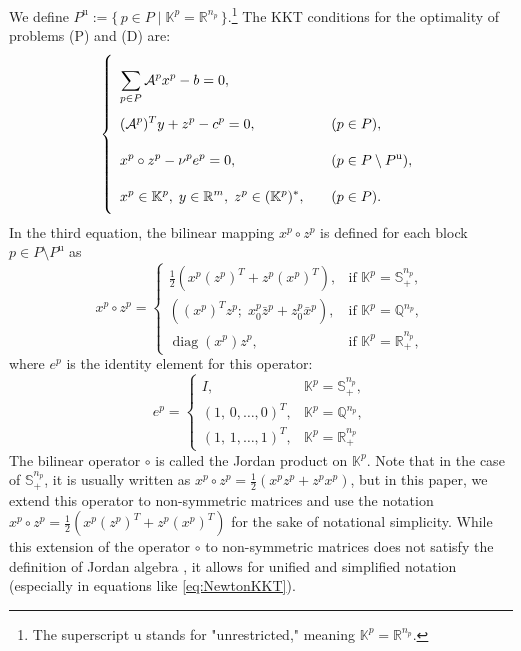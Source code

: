We define $P^{\text{u}} := \{\, p \in P \mid \mathbb{K}^p = \mathbb{R}^{n_p} \,\}$.\footnote{%
  The superscript $\text{u}$ stands for "unrestricted," meaning $\mathbb{K}^p = \mathbb{R}^{n_p}$.
}
The KKT conditions for the optimality of problems (P) and (D) are:
\begin{equation}
    \everymath{\displaystyle}
    \renewcommand{\arraystretch}{2.5}
    \left\{
    \begin{array}{ll}
        \sum_{p \in P} \mathcal{A}^p x^p - b = 0, & \\[-4pt]
        (\mathcal{A}^p)^T y + z^p - c^p = 0, & \quad (p \in P),\\[-4pt]
        x^p \circ z^p - \nu^p e^p = 0, & \quad (p \in P \setminus P^{\text{u}}),\\[-4pt]
        x^p \in \mathbb{K}^p,\; y \in \mathbb{R}^m,\; z^p \in (\mathbb{K}^p)^*, & \quad (p \in P).
    \end{array}
    \right.
    \label{eq:KKTcond}
\end{equation}
In the third equation, the bilinear mapping $x^p \circ z^p$ is defined for each block $p \in P \setminus P^{\text{u}}$ as
\[
  x^p \circ z^p = 
  \begin{cases}
    \frac{1}{2} \left( x^p (z^p)^T + z^p (x^p)^T \right), 
      & \text{if } \mathbb{K}^p = \mathbb{S}^{n_p}_+,\\[4pt]
    \left( (x^p)^T z^p;\; x^p_0 \bar{z}^p + z^p_0 \bar{x}^p \right),
      & \text{if } \mathbb{K}^p = \mathbb{Q}^{n_p},\\[4pt]
    \operatorname{diag}(x^p) z^p,
      & \text{if } \mathbb{K}^p = \mathbb{R}^{n_p}_+,
  \end{cases}
\]
where $e^p$ is the identity element for this operator:
\[
  e^p = 
  \begin{cases}
    I, & \mathbb{K}^p = \mathbb{S}^{n_p}_+,\\[3pt]
    (1,\,0,\ldots,0)^T, & \mathbb{K}^p = \mathbb{Q}^{n_p},\\[3pt]
    (1,\,1,\ldots,1)^T, & \mathbb{K}^p = \mathbb{R}^{n_p}_+ %
  \end{cases}
\]
The bilinear operator $\circ$ is called the Jordan product on $\mathbb{K}^p$.
Note that in the case of $\mathbb{S}^{n_p}_+$, it is usually written as $x^p \circ z^p = \frac{1}{2}(x^p z^p + z^p x^p)$, 
but in this paper, we extend this operator to non-symmetric matrices and use the notation $x^p \circ z^p = \frac{1}{2} \left( x^p (z^p)^T + z^p (x^p)^T \right)$ for the sake of notational simplicity.
While this extension of the operator $\circ$ to non-symmetric matrices does not satisfy the definition of Jordan algebra \cite{Faraut1994}, it allows for unified and simplified notation (especially in equations like \eqref{eq:NewtonKKT}).

